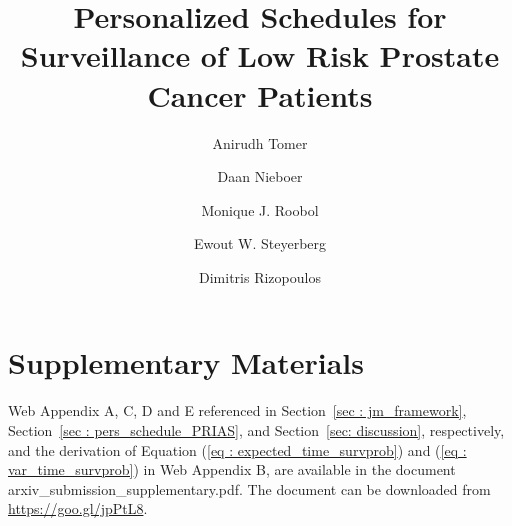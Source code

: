 \documentclass[a4paper]{article}
\begin{document}
\title{\textbf{Personalized Schedules for Surveillance of Low Risk Prostate Cancer Patients}}

\author[1,*]{Anirudh Tomer}
\author[2]{Daan Nieboer }
\author[3]{Monique J. Roobol }
\author[2,4]{Ewout W. Steyerberg }
\author[1]{Dimitris Rizopoulos}

\date{}

\maketitle











\section*{Supplementary Materials}

Web Appendix A, C, D and E referenced in Section~\ref{sec : jm_framework},  Section~\ref{sec : pers_schedule_PRIAS},  and  Section~\ref{sec: discussion}, respectively, and the derivation of Equation (\ref{eq : expected_time_survprob}) and (\ref{eq : var_time_survprob}) in Web Appendix B, are available in the document arxiv\_submission\_supplementary.pdf. The document can be downloaded from \url{https://goo.gl/jpPtL8}.\vspace*{-8pt}

\textbf{}

\clearpage
\printbibliography

\appendix
\end{document}
